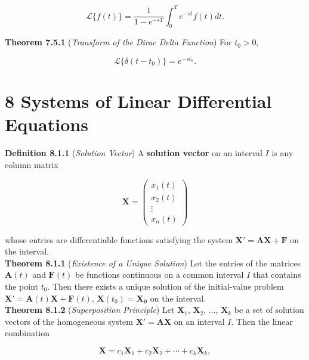 \documentclass[12pt]{article}
\begin{document}
\begin{equation}
    \mathcal{L} \{f(t)\} = \frac{1}{1-e^{-sT}} \int_0^T e^{-st} f(t) dt.
\end{equation}

\noindent\textbf{Theorem 7.5.1} (\emph{Transform of the Dirac Delta Function}) For \(t_0 > 0\),

\begin{equation}
    \mathcal{L} \{\delta(t - t_0)\} = e^{-st_0}.
\end{equation}

\newpage

\section*{8 Systems of Linear Differential Equations}

\noindent\textbf{Definition 8.1.1} (\emph{Solution Vector}) A \textbf{solution vector} on an interval \(I\) is any column matrix

\begin{equation}
    \mathbf{X} = \begin{pmatrix}
        x_1(t) \\
        x_2(t) \\
        \vdots \\
        x_n(t)
    \end{pmatrix}
\end{equation}

\noindent whose entries are differentiable functions satisfying the system \(\mathbf{X'} = \mathbf{AX} + \mathbf{F}\) on the interval.\\

\noindent\textbf{Theorem 8.1.1} (\emph{Existence of a Unique Solution}) Let the entries of the matrices \(\mathbf{A}(t)\) and \(\mathbf{F}(t)\) be functions continuous on a common interval \(I\) that contains the point \(t_0\). Then there exists a unique solution of the initial-value problem \(\mathbf{X'} = \mathbf{A}(t)\mathbf{X} + \mathbf{F}(t)\), \(\mathbf{X}(t_0) = \mathbf{X_0}\) on the interval.\\

\noindent\textbf{Theorem 8.1.2} (\emph{Superposition Principle}) Let \(\mathbf{X}_1\), \(\mathbf{X}_2\), \(\ldots\), \(\mathbf{X}_k\) be a set of solution vectors of the homogeneous system \(\mathbf{X'} = \mathbf{A}\mathbf{X}\) on an interval \(I\). Then the linear combination

\begin{equation}
    \mathbf{X} = c_1\mathbf{X}_1 + c_2\mathbf{X}_2 + \cdots + c_k\mathbf{X}_k,
\end{equation}
\end{document}
